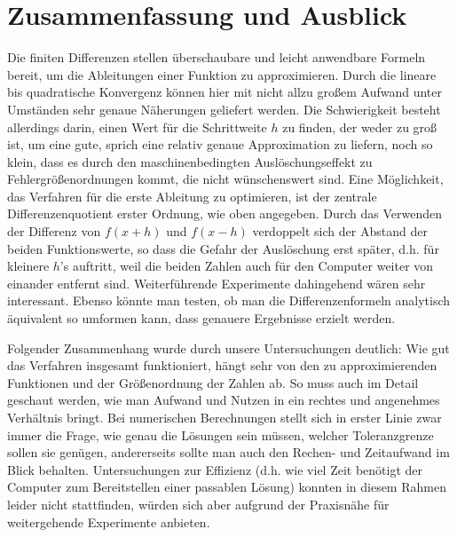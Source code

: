\documentclass{scrartcl}
\begin{document}
\pagebreak \section{Zusammenfassung und Ausblick}
\label{sec:zusammenfassung}
Die finiten Differenzen stellen überschaubare und leicht anwendbare Formeln bereit, um die Ableitungen einer Funktion zu approximieren.
Durch die lineare bis quadratische Konvergenz können hier mit nicht allzu großem Aufwand unter Umständen sehr genaue Näherungen geliefert werden.
Die Schwierigkeit besteht allerdings darin, einen Wert für die Schrittweite $h$ zu finden, der weder zu groß ist, um eine gute, sprich eine relativ genaue Approximation zu liefern, noch so klein, dass es durch den maschinenbedingten Auslöschungseffekt zu Fehlergrößenordnungen kommt, die nicht wünschenswert sind.
Eine Möglichkeit, das Verfahren für die erste Ableitung zu optimieren, ist der zentrale Differenzenquotient erster Ordnung, wie oben angegeben. Durch das Verwenden der Differenz von $f(x+h)$ und $f(x-h)$ verdoppelt sich der Abstand der beiden Funktionswerte, so dass die Gefahr der Auslöschung erst später, d.h. für kleinere $h$'s auftritt, weil die beiden Zahlen auch für den Computer weiter von einander entfernt sind.
Weiterführende Experimente dahingehend wären sehr interessant.
Ebenso könnte man testen, ob man die Differenzenformeln analytisch äquivalent so umformen kann, dass genauere Ergebnisse erzielt werden.

Folgender Zusammenhang wurde durch unsere Untersuchungen deutlich:
Wie gut das Verfahren insgesamt funktioniert, hängt sehr von den zu approximierenden Funktionen und der Größenordnung der Zahlen ab.
So muss auch im Detail geschaut werden, wie man Aufwand und Nutzen in ein rechtes und angenehmes Verhältnis bringt.
Bei numerischen Berechnungen stellt sich in erster Linie zwar immer die Frage, wie genau die Lösungen sein müssen, welcher Toleranzgrenze sollen sie genügen, andererseits sollte man auch den Rechen- und Zeitaufwand im Blick behalten.
Untersuchungen zur Effizienz (d.h. wie viel Zeit benötigt der Computer zum Bereitstellen einer passablen Lösung) konnten in diesem Rahmen leider nicht stattfinden, würden sich aber aufgrund der Praxisnähe für weitergehende Experimente anbieten.



\end{document}
